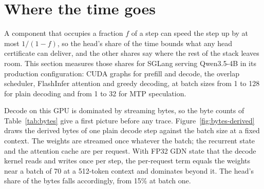 \section{Where the time goes}\label{sec:time}
A component that occupies a fraction $f$ of a step can speed the step up by at most $1/(1-f)$, so the head's share of the time bounds what any head certificate can deliver, and the other shares say where the rest of the stack leaves room. This section measures those shares for SGLang serving Qwen3.5-4B in its production configuration: CUDA graphs for prefill and decode, the overlap scheduler, FlashInfer attention and greedy decoding, at batch sizes from 1 to 128 for plain decoding and from 1 to 32 for MTP speculation.

Decode on this GPU is dominated by streaming bytes, so the byte counts of Table~\ref{tab:bytes} give a first picture before any trace. Figure~\ref{fig:bytes-derived} draws the derived bytes of one plain decode step against the batch size at a fixed context. The weights are streamed once whatever the batch; the recurrent state and the attention cache are per request. With FP32 GDN state that the decode kernel reads and writes once per step, the per-request term equals the weights near a batch of 70 at a 512-token context and dominates beyond it. The head's share of the bytes falls accordingly, from 15\% at batch one.

